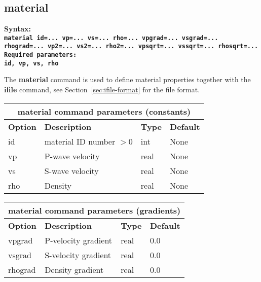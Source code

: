 \documentclass[11pt]{report}
\begin{document}
\subsection{material}
\label{keyword:material}
\begin{flushleft}\bf
Syntax:\\
\tt material
id=... vp=... vs=... rho=... vpgrad=... vsgrad=... rhograd=... vp2=... vs2=... rho2=... vpsqrt=... vssqrt=... rhosqrt=...\\ 
\bf Required parameters:\\
\tt id, vp, vs, rho
\end{flushleft}
The {\bf material} command is used to define material properties together with the {\bf ifile}
command, see Section~\ref{sec:ifile-format} for the file format.
\begin{center}
\begin{tabular}{|l|p{8cm}|l|l|} \hline
\multicolumn{4}{|c|}{\bf material command parameters (constants)}\\ \hline
\bf{Option} & \bf{Description} & \bf{Type} & \bf{Default} \\ \hline \hline
id & material ID number $>0$         & int & None  \\ \hline
vp & P-wave velocity & real & None \\ \hline
vs & S-wave velocity & real & None \\ \hline
rho & Density & real & None \\ \hline
\end{tabular}
\end{center}
\begin{center}
\begin{tabular}{|l|p{8cm}|l|l|} \hline
\multicolumn{4}{|c|}{\bf material command parameters (gradients)}\\ \hline
\bf{Option} & \bf{Description} & \bf{Type} & \bf{Default} \\ \hline \hline
vpgrad & P-velocity gradient & real & 0.0 \\ \hline
vsgrad & S-velocity gradient & real & 0.0 \\ \hline
rhograd & Density gradient   & real & 0.0 \\ \hline
\end{tabular}
\end{center}
\end{document}
